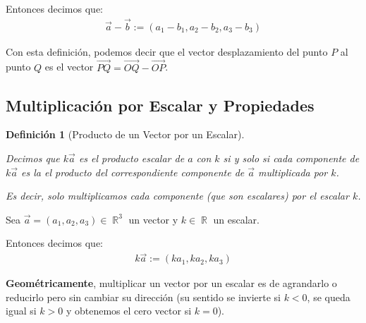 \documentclass[12pt, fleqn]{report}                             %
\newtheorem{Definition}     {Definición}[section]               %
\theoremstyle{break}                                            %
\DeclareMathOperator \Reals        {\mathbb{R}}                 %
\newcommand{\lVec}[1]   {\overrightarrow{#1}}                   %
\begin{document}
                Entonces decimos que:
                \begin{align}
                    \vec{a} - \vec{b} := (a_1 - b_1, a_2 - b_2, a_3 - b_3)
                \end{align}
            
                Con esta definición, podemos decir que el vector desplazamiento del punto $P$ al punto $Q$
                es el vector $\lVec{PQ} = \lVec{OQ} - \lVec{OP}$.
                
            \clearpage
            \subsection{Multiplicación por Escalar y Propiedades}

                \begin{Definition}[Producto de un Vector por un Escalar]
                    \label{DefProductoVectorEscalar}

                    Decimos que $k \vec{a}$ es el producto escalar de $a$ con $k$
                    si y solo si cada componente de $k \vec{a}$ es la el producto del correspondiente componente
                    de $\vec{a}$ multiplicada por $k$.

                    Es decir, solo multiplicamos cada componente (que son escalares) por el escalar $k$.

                \end{Definition}

                Sea $\vec{a}=(a_1, a_2, a_3) \in \Reals^3$ un vector y $k \in \Reals$ un escalar.
                
                Entonces decimos que:
                \begin{align}
                    k\vec{a} := (ka_1, ka_2, ka_3)
                \end{align}

                \textbf{Geométricamente}, multiplicar un vector por un escalar es de agrandarlo o reducirlo pero
                sin cambiar su dirección (su sentido se invierte si $k < 0$, se queda igual si $k > 0$ y
                obtenemos el cero vector si $k = 0$).


  

        \clearpage
\end{document}
